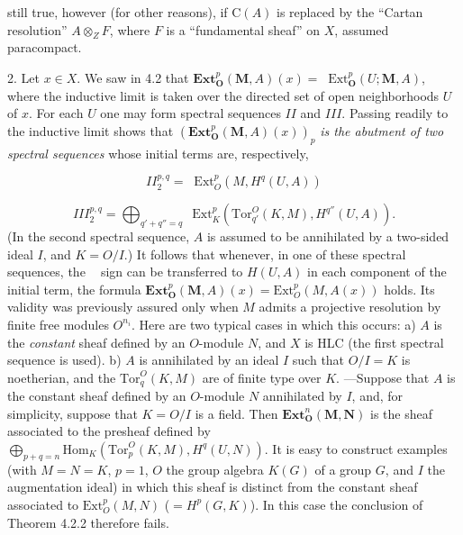 \clearpage
{}

still true, however (for other reasons), if $\mathrm C(A)$ is replaced by the
``Cartan resolution'' $A\otimes_ZF$, where $F$ is a ``fundamental
sheaf'' on $X$, assumed paracompact.

2. Let $x\in X$. We saw in 4.2 that
$\mathbf{Ext}_{\mathbf O}^p(\mathbf M,A)(x)=
\mathop{\underset{\to}{\mathrm{lim.}}}\mathrm{Ext}_{\mathbf O}^p(U;\mathbf M,A)$, where the inductive limit is
taken over the directed set of open neighborhoods $U$ of $x$.
For each $U$ one may form spectral sequences $II$ and $III$. Passing readily
to the inductive limit shows that
$(\mathbf{Ext}_{\mathbf O}^p(\mathbf M,A)(x))_p$ \textit{is the abutment of two
spectral sequences} whose initial terms are, respectively,

\[
II_2^{p,q}=\mathop{\underset{\to}{\mathrm{lim.}}}
\mathrm{Ext}_O^p(M,H^q(U,A))
\]

\[
III_2^{p,q}=
\bigoplus_{q'+q''=q}\mathop{\underset{\to}{\mathrm{lim.}}}
\mathrm{Ext}_K^p(\mathrm{Tor}_{q'}^O(K,M),H^{q''}(U,A)).
\]
(In the second spectral sequence, $A$ is assumed to be annihilated by a
two-sided ideal $I$, and $K=O/I$.)
It follows that whenever, in one of these spectral sequences, the $\mathop{\underset{\to}{\mathrm{lim.}}}$ sign can be transferred to $H(U,A)$ in each component of the initial term, the
formula
$\mathbf{Ext}_{\mathbf O}^p(\mathbf M,A)(x)=
\mathrm{Ext}_O^p(M,A(x))$ holds. Its validity was previously assured only
when $M$ admits a projective resolution by finite free modules $O^{n_i}$.
Here are two typical cases in which this occurs:
a) $A$ is the \textit{constant} sheaf defined by an $O$-module $N$, and $X$ is HLC
(the first spectral sequence is used).
b) $A$ is annihilated by an ideal $I$ such that $O/I=K$ is noetherian, and the
$\mathrm{Tor}_q^O(K,M)$ are of finite type over $K$. ---Suppose that $A$ is
the constant sheaf defined by an $O$-module $N$ annihilated by $I$, and, for
simplicity, suppose that $K=O/I$ is a field. Then
$\mathbf{Ext}_{\mathbf O}^n(\mathbf M,\mathbf N)$ is the sheaf associated to
the presheaf defined by
$\displaystyle \bigoplus_{p+q=n}
\mathrm{Hom}_K(\mathrm{Tor}_p^O(K,M),H^q(U,N)).$
It is easy to construct examples (with $M=N=K$, $p=1$, $O$ the group algebra
$K(G)$ of a group $G$, and $I$ the augmentation ideal) in which this sheaf is
distinct from the constant sheaf associated to
$\mathrm{Ext}_O^p(M,N)$ ($=H^p(G,K)$). In this case the conclusion of Theorem
4.2.2 therefore fails.


